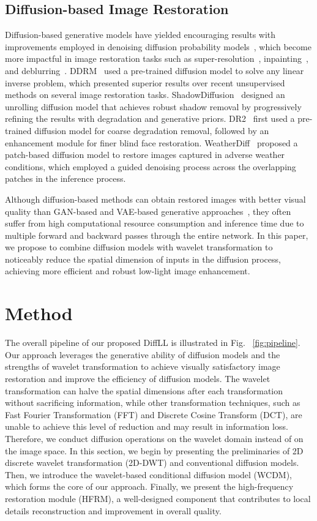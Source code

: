 \subsection{Diffusion-based Image Restoration}
Diffusion-based generative models have yielded encouraging results with improvements employed in denoising diffusion probability models~\cite{ddpm}, which become more impactful in image restoration tasks such as super-resolution~\cite{IR_SDE,ResDiff}, inpainting~\cite{ddpm_inpainting}, and deblurring~\cite{ddpm_deblurring}. DDRM~\cite{ddrm} used a pre-trained diffusion model to solve any linear inverse problem, which presented superior results over recent unsupervised methods on several image restoration tasks. ShadowDiffusion~\cite{shadowdiffusion} designed an unrolling diffusion model that achieves robust shadow removal by progressively refining the results with degradation and generative priors. DR2~\cite{DR2} first used a pre-trained diffusion model for coarse degradation removal, followed by an enhancement module for finer blind face restoration. WeatherDiff~\cite{weatherdiff} proposed a patch-based diffusion model to restore images captured in adverse weather conditions, which employed a guided denoising process across the overlapping patches in the inference process.

Although diffusion-based methods can obtain restored images with better visual quality than GAN-based and VAE-based generative approaches~\cite{gan_face_restoration,VAE_inpainting}, they often suffer from high computational resource consumption and inference time due to multiple forward and backward passes through the entire network. In this paper, we propose to combine diffusion models with wavelet transformation to noticeably reduce the spatial dimension of inputs in the diffusion process, achieving more efficient and robust low-light image enhancement.

\section{Method}\label{sec:method}
The overall pipeline of our proposed DiffLL is illustrated in Fig. ~\ref{fig:pipeline}. Our approach leverages the generative ability of diffusion models and the strengths of wavelet transformation to achieve visually satisfactory image restoration and improve the efficiency of diffusion models. The wavelet transformation can halve the spatial dimensions after each transformation without sacrificing information, while other transformation techniques, such as Fast Fourier Transformation (FFT) and Discrete Cosine Transform (DCT), are unable to achieve this level of reduction and may result in information loss. Therefore, we conduct diffusion operations on the wavelet domain instead of on the image space. In this section, we begin by presenting the preliminaries of 2D discrete wavelet transformation (2D-DWT) and conventional diffusion models. Then, we introduce the wavelet-based conditional diffusion model (WCDM), which forms the core of our approach. Finally, we present the high-frequency restoration module (HFRM), a well-designed component that contributes to local details reconstruction and improvement in overall quality.
